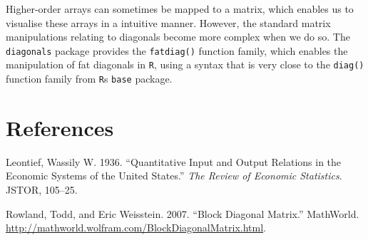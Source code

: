 \documentclass[article]{jss}
\begin{document}
Higher-order arrays can sometimes be mapped to a matrix, which enables
us to visualise these arrays in a intuitive manner. However, the
standard matrix manipulations relating to diagonals become more complex
when we do so. The \texttt{diagonals} package provides the
\texttt{fatdiag()} function family, which enables the manipulation of
fat diagonals in \texttt{R}, using a syntax that is very close to the
\texttt{diag()} function family from \texttt{R}s \texttt{base} package.

\section*{References}\label{references}

Leontief, Wassily W. 1936. ``Quantitative Input and Output Relations in
the Economic Systems of the United States.'' \emph{The Review of
Economic Statistics}. JSTOR, 105--25.

Rowland, Todd, and Eric Weisstein. 2007. ``Block Diagonal Matrix.''
MathWorld. \url{http://mathworld.wolfram.com/BlockDiagonalMatrix.html}.
\end{document}
